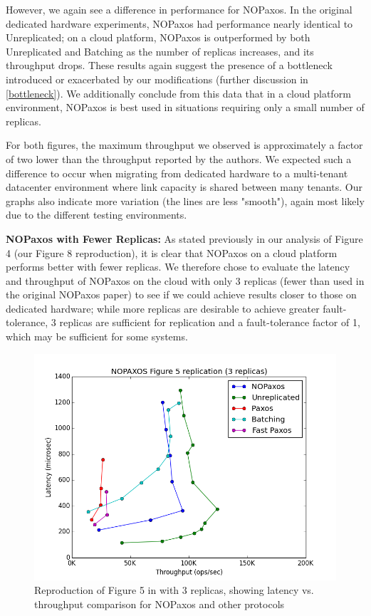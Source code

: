 However, we again see a difference in performance for NOPaxos. In the original dedicated hardware experiments, NOPaxos had performance nearly identical to Unreplicated; on a cloud platform, NOPaxos is outperformed by both Unreplicated and Batching as the number of replicas increases, and its throughput drops. These results again suggest the presence of a bottleneck introduced or exacerbated by our modifications (further discussion in \ref{bottleneck}). We additionally conclude from this data that in a cloud platform environment, NOPaxos is best used in situations requiring only a small number of replicas. 

For both figures, the maximum throughput we observed is approximately a factor of two lower than the throughput reported by the authors. We expected such a difference to occur when migrating from dedicated hardware to a multi-tenant datacenter environment where link capacity is shared between many tenants. Our graphs also indicate more variation (the lines are less "smooth"), again most likely due to the different testing environments.

\textbf{NOPaxos with Fewer Replicas: }As stated previously in our analysis of Figure 4 (our Figure 8 reproduction), it is clear that NOPaxos on a cloud platform performs better with fewer replicas. We therefore chose to evaluate the latency and throughput of NOPaxos on the cloud with only 3 replicas (fewer than used in the original NOPaxos paper) to see if we could achieve results closer to those on dedicated hardware; while more replicas are desirable to achieve greater fault-tolerance, 3 replicas are sufficient for replication and a fault-tolerance factor of 1, which may be sufficient for some systems. 

\begin{figure}[tp]
\centering
\includegraphics[scale=0.5]{figures/Figure5-3.png}
\caption{Reproduction of Figure 5 in \cite{nopaxos} with 3 replicas, showing latency vs. throughput comparison for NOPaxos and other protocols}
\end{figure}

